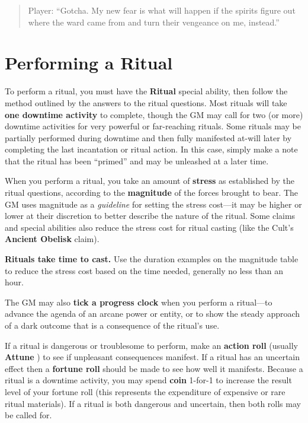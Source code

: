 \documentclass[11pt,oneside]{book}
\newcommand{\gameterm}[1]{\textbf{#1}}
\begin{document}
\begin{quote}
	Player: “Gotcha. My new fear is what will happen if the spirits figure out where the ward came from and turn their vengeance on me, instead.”
\end{quote} 

\section{Performing a Ritual}

To perform a ritual, you must have the \gameterm{Ritual}  special ability, then follow the method outlined by the answers to the ritual questions. Most rituals will take \textbf{one downtime activity} to complete, though the GM may call for two (or more) downtime activities for very powerful or far-reaching rituals. Some rituals may be partially performed during downtime and then fully manifested at-will later by completing the last incantation or ritual action. In this case, simply make a note that the ritual has been “primed” and may be unleashed at a later time.

When you perform a ritual, you take an amount of \textbf{stress} as established by the ritual questions, according to the \textbf{magnitude} of the forces brought to bear. The GM uses magnitude as a \emph{guideline} for setting the stress cost---it may be higher or lower at their discretion to better describe the nature of the ritual. Some claims and special abilities also reduce the stress cost for ritual casting (like the Cult’s \textbf{Ancient Obelisk} claim).

\textbf{Rituals take time to cast.} Use the duration examples on the magnitude table to reduce the stress cost based on the time needed, generally no less than an hour.

The GM may also \textbf{tick a progress clock} when you perform a ritual---to advance the agenda of an arcane power or entity, or to show the steady approach of a dark outcome that is a consequence of the ritual’s use.

If a ritual is dangerous or troublesome to perform, make an \textbf{action roll} (usually \gameterm{Attune} ) to see if unpleasant consequences manifest. If a ritual has an uncertain effect then a \textbf{fortune roll} should be made to see how well it manifests. Because a ritual is a downtime activity, you may spend \gameterm{coin}  1-for-1 to increase the result level of your fortune roll (this represents the expenditure of expensive or rare ritual materials). If a ritual is both dangerous and uncertain, then both rolls may be called for.
\end{document}
